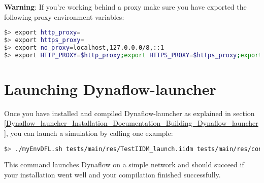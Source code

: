 \documentclass[a4paper, 12pt]{report}
\begin{document}
\textbf{Warning}: If you're working behind a proxy make sure you have exported the following proxy environment variables:

\begin{lstlisting}[language=bash, columns=fullflexible]
$> export http_proxy=
$> export https_proxy=
$> export no_proxy=localhost,127.0.0.0/8,::1
$> export HTTP_PROXY=$http_proxy;export HTTPS_PROXY=$https_proxy;export NO_PROXY=$no_proxy;
\end{lstlisting}

\section[Launching Dynaflow-launcher]{Launching Dynaflow-launcher}

Once you have installed and compiled Dynaflow-launcher as explained in section \ref{Dynaflow_launcher_Installation_Documentation_Building_Dynaflow_launcher},
you can launch a simulation by calling one example:

\begin{lstlisting}[language=bash, breaklines=true, breakatwhitespace=false, columns=fullflexible]
$> ./myEnvDFL.sh tests/main/res/TestIIDM_launch.iidm tests/main/res/config_launch.json
\end{lstlisting}

This command launches Dynaflow on a simple network and should succeed if your installation went well and your compilation finished successfully.
\end{document}
